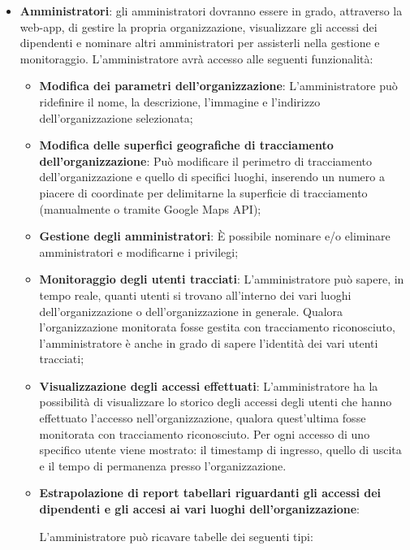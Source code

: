 \begin{itemize}
\item
  \textbf{Amministratori}: gli amministratori dovranno essere in grado,
  attraverso la web-app, di gestire la propria organizzazione,
  visualizzare gli accessi dei dipendenti e nominare altri
  amministratori per assisterli nella gestione e monitoraggio.
  L'amministratore avrà accesso alle seguenti funzionalità:

  \begin{itemize}
  \item
    \textbf{Modifica dei parametri dell'organizzazione}:
    L'amministratore può ridefinire il nome, la descrizione, l'immagine
    e l'indirizzo dell'organizzazione selezionata;
  \item
    \textbf{Modifica delle superfici geografiche di tracciamento
    dell'organizzazione}: Può modificare il perimetro di tracciamento
    dell'organizzazione e quello di specifici luoghi, inserendo un
    numero a piacere di coordinate per delimitarne la superficie di
    tracciamento (manualmente o tramite Google Maps API);
  \item
    \textbf{Gestione degli amministratori}: È possibile nominare e/o
    eliminare amministratori e modificarne i privilegi;
  \item
    \textbf{Monitoraggio degli utenti tracciati}: L'amministratore può
    sapere, in tempo reale, quanti utenti si trovano all'interno dei
    vari luoghi dell'organizzazione o dell'organizzazione in generale.
    Qualora l'organizzazione monitorata fosse gestita con tracciamento
    riconosciuto, l'amministratore è anche in grado di sapere l'identità
    dei vari utenti tracciati;
  \item
    \textbf{Visualizzazione degli accessi effettuati}: L'amministratore
    ha la possibilità di visualizzare lo storico degli accessi degli
    utenti che hanno effettuato l'accesso nell'organizzazione, qualora
    quest'ultima fosse monitorata con tracciamento riconosciuto. Per
    ogni accesso di uno specifico utente viene mostrato: il timestamp di
    ingresso, quello di uscita e il tempo di permanenza presso
    l'organizzazione.
  \item
    \textbf{Estrapolazione di report tabellari riguardanti gli accessi
    dei dipendenti e gli accesi ai vari luoghi dell'organizzazione}:

    L'amministratore può ricavare tabelle dei seguenti tipi:


\end{itemize}
\end{itemize}
